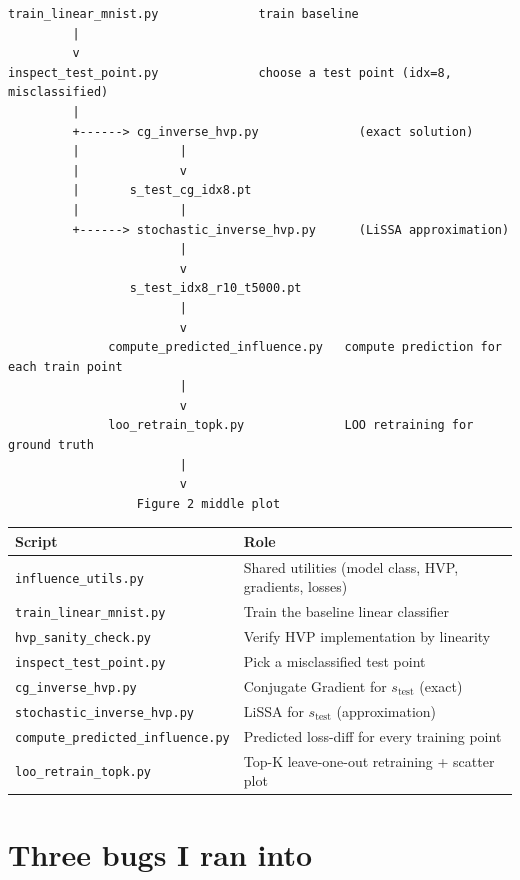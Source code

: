 \documentclass[a4paper,11pt]{article}
\begin{document}
\begin{Verbatim}[frame=single, fontsize=\small]
train_linear_mnist.py              train baseline
         |
         v
inspect_test_point.py              choose a test point (idx=8, misclassified)
         |
         +------> cg_inverse_hvp.py              (exact solution)
         |              |
         |              v
         |       s_test_cg_idx8.pt
         |              |
         +------> stochastic_inverse_hvp.py      (LiSSA approximation)
                        |
                        v
                 s_test_idx8_r10_t5000.pt
                        |
                        v
              compute_predicted_influence.py   compute prediction for each train point
                        |
                        v
              loo_retrain_topk.py              LOO retraining for ground truth
                        |
                        v
                  Figure 2 middle plot
\end{Verbatim}

\begin{table}[h]
\centering
\small
\begin{tabular}{lp{8.5cm}}
\toprule
Script & Role \\
\midrule
\texttt{influence\_utils.py} & Shared utilities (model class, HVP, gradients, losses) \\
\texttt{train\_linear\_mnist.py} & Train the baseline linear classifier \\
\texttt{hvp\_sanity\_check.py} & Verify HVP implementation by linearity \\
\texttt{inspect\_test\_point.py} & Pick a misclassified test point \\
\texttt{cg\_inverse\_hvp.py} & Conjugate Gradient for $s_{\text{test}}$ (exact) \\
\texttt{stochastic\_inverse\_hvp.py} & LiSSA for $s_{\text{test}}$ (approximation) \\
\texttt{compute\_predicted\_influence.py} & Predicted loss-diff for every training point \\
\texttt{loo\_retrain\_topk.py} & Top-K leave-one-out retraining + scatter plot \\
\bottomrule
\end{tabular}
\end{table}

\section{Three bugs I ran into}
\end{document}
